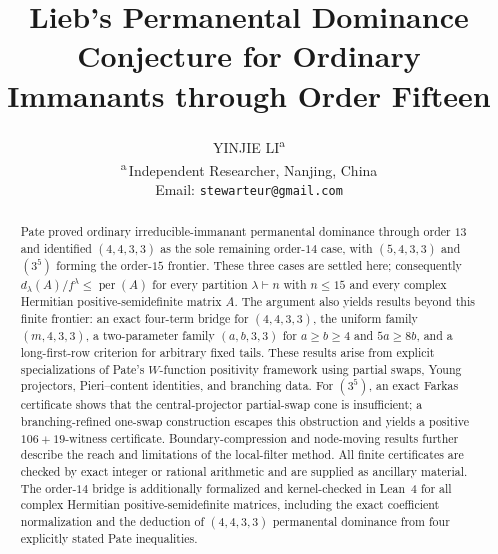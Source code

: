 \documentclass[11pt]{article}
\title{Lieb's Permanental Dominance Conjecture for Ordinary Immanants through Order Fifteen}
\author{YINJIE LI\textsuperscript{a}\\[-0.1em]
\small\textsuperscript{a}\,Independent Researcher, Nanjing, China\\[-0.1em]
\small Email: \texttt{stewarteur@gmail.com}}
\date{}
\theoremstyle{definition}
\newcommand{\per}{\operatorname{per}}
\begin{document}
\maketitle

\begin{abstract}
Pate proved ordinary irreducible-immanant permanental dominance through order $13$ and identified $(4,4,3,3)$ as the sole remaining order-$14$ case, with $(5,4,3,3)$ and $(3^5)$ forming the order-$15$ frontier.  These three cases are settled here; consequently $d_\lambda(A)/f^\lambda\le\per(A)$ for every partition $\lambda\vdash n$ with $n\le15$ and every complex Hermitian positive-semidefinite matrix $A$.  The argument also yields results beyond this finite frontier: an exact four-term bridge for $(4,4,3,3)$, the uniform family $(m,4,3,3)$, a two-parameter family $(a,b,3,3)$ for $a\ge b\ge4$ and $5a\ge8b$, and a long-first-row criterion for arbitrary fixed tails.  These results arise from explicit specializations of Pate's $W$-function positivity framework using partial swaps, Young projectors, Pieri--content identities, and branching data.  For $(3^5)$, an exact Farkas certificate shows that the central-projector partial-swap cone is insufficient; a branching-refined one-swap construction escapes this obstruction and yields a positive $106+19$-witness certificate.  Boundary-compression and node-moving results further describe the reach and limitations of the local-filter method.  All finite certificates are checked by exact integer or rational arithmetic and are supplied as ancillary material.  The order-$14$ bridge is additionally formalized and kernel-checked in Lean~4 for all complex Hermitian positive-semidefinite matrices, including the exact coefficient normalization and the deduction of $(4,4,3,3)$ permanental dominance from four explicitly stated Pate inequalities.
\end{abstract}

\begingroup
\renewcommand{\thefootnote}{}
\addtocounter{footnote}{-1}
\endgroup
\end{document}
